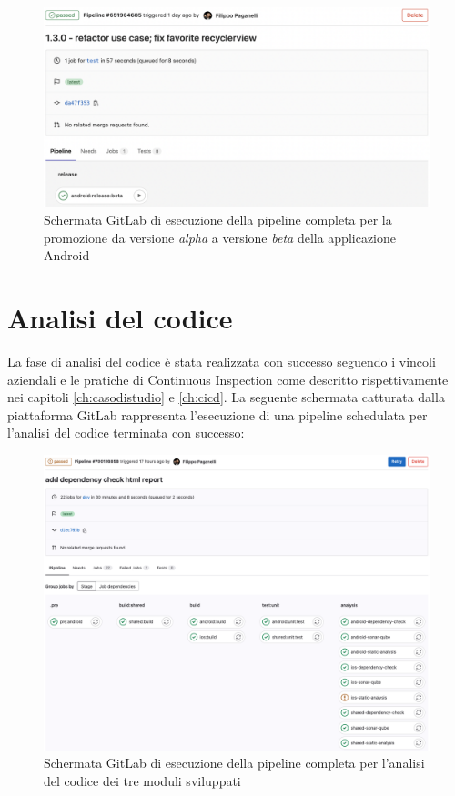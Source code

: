 \begin{figure}[H]
\centering
    \includegraphics[width=1\textwidth]{img/gitlab-pipeline-android-beta.png}
    \caption{Schermata GitLab di esecuzione della pipeline completa per la promozione da versione \textit{alpha} a versione \textit{beta} della applicazione Android}
    \label{gitlab-pipeline-android-beta}
\end{figure}

\section{Analisi del codice}
La fase di analisi del codice è stata realizzata con successo seguendo i vincoli aziendali e le pratiche di Continuous Inspection come descritto rispettivamente nei capitoli \ref{ch:casodistudio} e \ref{ch:cicd}. La seguente schermata catturata dalla piattaforma GitLab rappresenta l'esecuzione di una pipeline schedulata per l'analisi del codice terminata con successo:

\begin{figure}[H]
\centering
    \includegraphics[width=1\textwidth]{img/gitlab-pipeline-analysis.png}
    \caption{Schermata GitLab di esecuzione della pipeline completa per l'analisi del codice dei tre moduli sviluppati}
    \label{gitlab-pipeline-analysis}
\end{figure}

